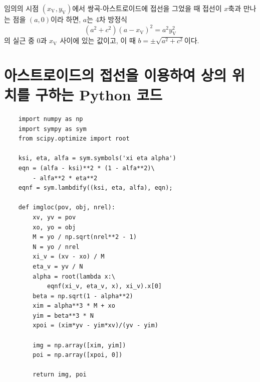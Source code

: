 \documentclass[twocolumn]{article}
\begin{document}
임의의 시점 $(x_{\mathrm{V}^{}}, y_{\mathrm{V}}^{})$에서 쌍곡-아스트로이드에 접선을 그었을 때 접선이 $x$축과 만나는 점을 $(a,0)$이라 하면, $a$는 4차 방정식
$$ \left( a^2 + c^2 \right) \left(a - x_{\mathrm{V}}^{} \right)^2 = a^2 y_{\mathrm{V}}^2$$
의 실근 중 $0$과 $x_{\mathrm{V}^{}}$ 사이에 있는 값이고, 이 때 $b = \pm \sqrt{a^2 + c^2}$이다.

\section{아스트로이드의 접선을 이용하여 상의 위치를 구하는 Python 코드} \label{app:python}
\begin{verbatim}
	import numpy as np
	import sympy as sym
	from scipy.optimize import root
	
	ksi, eta, alfa = sym.symbols('xi eta alpha')
	eqn = (alfa - ksi)**2 * (1 - alfa**2)\
	    - alfa**2 * eta**2
	eqnf = sym.lambdify((ksi, eta, alfa), eqn);
	
	def imgloc(pov, obj, nrel):
	    xv, yv = pov
	    xo, yo = obj
	    M = yo / np.sqrt(nrel**2 - 1)
	    N = yo / nrel
	    xi_v = (xv - xo) / M
	    eta_v = yv / N
	    alpha = root(lambda x:\
	        eqnf(xi_v, eta_v, x), xi_v).x[0]
	    beta = np.sqrt(1 - alpha**2)
	    xim = alpha**3 * M + xo
	    yim = beta**3 * N
	    xpoi = (xim*yv - yim*xv)/(yv - yim)
	
	    img = np.array([xim, yim])
	    poi = np.array([xpoi, 0])
	
	    return img, poi
\end{verbatim}

\end{document}
